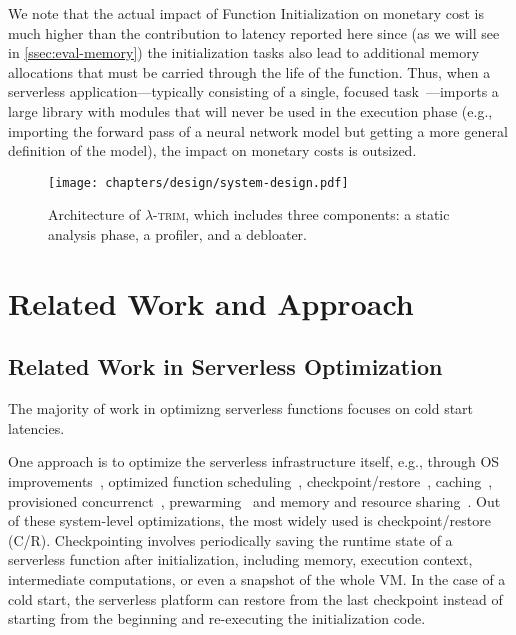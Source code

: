 \documentclass[sigplan,nonacm]{acmart}
\newcommand{\sys}{\textsc{\ensuremath{\lambda}-trim}\xspace}
\begin{document}
We note that the actual impact of Function Initialization on monetary cost is much higher than the contribution to latency reported here since (as we will see in \cref{ssec:eval-memory}) the initialization tasks also lead to additional memory allocations that must be carried through the life of the function.
Thus, when a serverless application---typically consisting of a single, focused task~\cite{serverless-app-dev2021}---imports a large library with modules that will never be used in the execution phase (e.g., importing the forward pass of a neural network model but getting a more general definition of the model), the impact on monetary costs is outsized.

\begin{figure}[t]
  \centering
\texttt{[image: chapters/design/system-design.pdf]}
  \caption{Architecture of \sys, which includes three components: a static analysis phase, a profiler, and a debloater.}
  \label{fig:system-design}
\end{figure}




 
  
\section{Related Work and Approach}

\subsection{Related Work in Serverless Optimization}
\label{sec:related-coldstarts}



The majority of work in optimizng serverless functions focuses on cold start latencies.

One approach is to optimize the serverless infrastructure itself, e.g., through OS improvements~\cite{firecracker2020, catalyzer2020, faasnap2022}, optimized function scheduling~\cite{caerus2021, LCS2023, sustainableServerless24}, checkpoint/restore~\cite{catalyzer2020, prebaking2020}, caching~\cite{faascache2021,SCache23,rainbowcake, containerLoading2023}, provisioned concurrenct~\cite{provisionedConcurrency}, prewarming~\cite{icebreaker22} and memory and resource sharing~\cite{medes22, tetris2022, containerSharing2022}.
Out of these system-level optimizations, the most widely used is checkpoint/restore
(C/R).
Checkpointing involves periodically saving the runtime state of a serverless function after initialization, including memory, execution context, intermediate computations, or even a snapshot of the whole VM. 
In the case of a cold start, the serverless platform can restore from the last checkpoint instead of starting from the beginning and re-executing the initialization code.
\end{document}
